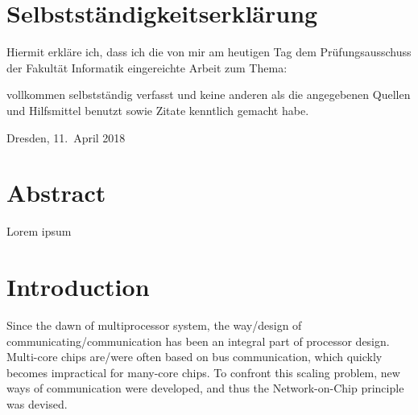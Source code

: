 \documentclass[
	paper=a4,
	fontsize=11pt,
	parskip=full %
]{scrreprt}
\begin{document}
	\chapter*{Selbstständigkeitserklärung}
	Hiermit erkläre ich, dass ich die von mir am heutigen Tag dem Prüfungsausschuss der Fakultät Informatik eingereichte Arbeit zum Thema:
	\begin{center}
		\textit{\thetitle} 
	\end{center}
	
	vollkommen selbstständig verfasst und keine anderen als die angegebenen Quellen und Hilfsmittel benutzt sowie Zitate kenntlich gemacht habe.
	
	Dresden, 11.\ April 2018 \\ %
	\theauthor
	
	
	\chapter*{Abstract}
    Lorem ipsum
	
	\tableofcontents
	
	
	\listoftables
	\vspace{-2.6\baselineskip}
	\begingroup
	\let\clearpage\relax
	\listoffigures
	\endgroup
	
	
	\chapter{Introduction}\label{ch:introduction}
    Since the dawn of multiprocessor system, the way/design of communicating/communication has been an integral part of processor design.
    Multi-core chips are/were often based on bus communication, which quickly becomes impractical for many-core chips.
    To confront this scaling problem, new ways of communication were developed, and thus the Network-on-Chip principle was devised.
\end{document}
